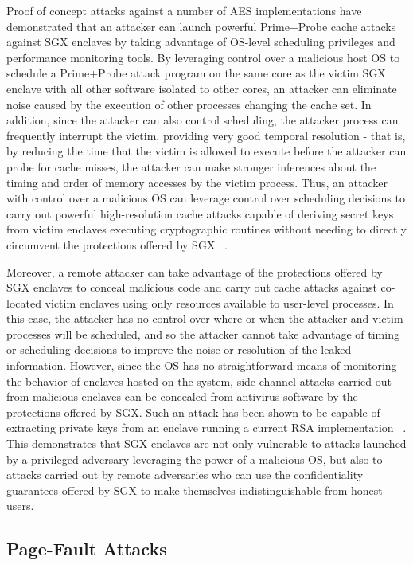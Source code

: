 Proof of concept attacks against a number of AES implementations have demonstrated that an attacker can launch powerful Prime+Probe cache attacks against SGX enclaves by taking advantage of OS-level scheduling privileges and performance monitoring tools. By leveraging control over a malicious host OS to schedule a Prime\-+Probe attack program on the same core as the victim SGX enclave with all other software isolated to other cores, an attacker can eliminate noise caused by the execution of other processes changing the cache set. In addition, since the attacker can also control scheduling, the attacker process can frequently interrupt the victim, providing very good temporal resolution - that is, by reducing the time that the victim is allowed to execute before the attacker can probe for cache misses, the attacker can make stronger inferences about the timing and order of memory accesses by the victim process. Thus, an attacker with control over a malicious OS can leverage control over scheduling decisions to carry out powerful high-resolution cache attacks capable of deriving secret keys from victim enclaves executing cryptographic routines without needing to directly circumvent the protections offered by SGX ~\cite{moghimi_cachezoom:_2017, gotzfried_cache_2017}.

Moreover, a remote attacker can take advantage of the protections offered by SGX enclaves to conceal malicious code and carry out cache attacks against co-located victim enclaves using only resources available to user-level processes. In this case, the attacker has no control over where or when the attacker and victim processes will be scheduled, and so the attacker cannot take advantage of timing or scheduling decisions to improve the noise or resolution of the leaked information. However, since the OS has no straightforward means of monitoring the behavior of enclaves hosted on the system, side channel attacks carried out from malicious enclaves can be concealed from antivirus software by the protections offered by SGX. Such an attack has been shown to be capable of extracting private keys from an enclave running a current RSA implementation ~\cite{schwarz_malware_2017}. This demonstrates that SGX enclaves are not only vulnerable to attacks launched by a privileged adversary leveraging the power of a malicious OS, but also to attacks carried out by remote adversaries who can use the confidentiality guarantees offered by SGX to make themselves indistinguishable from honest users.

\subsection{Page-Fault Attacks}

